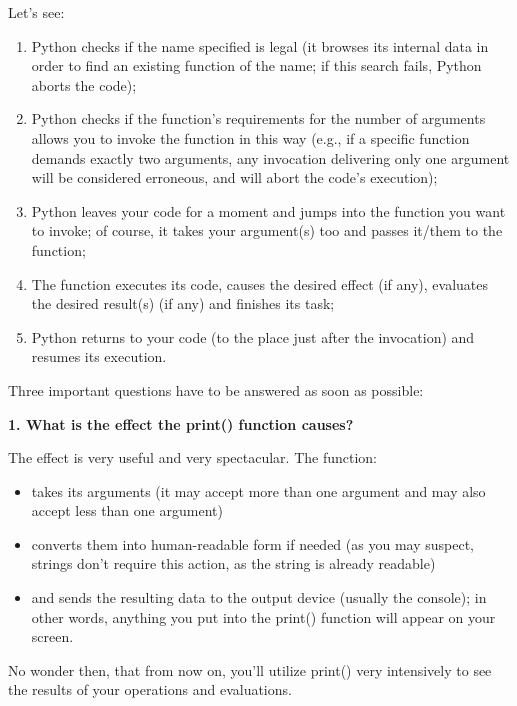 \documentclass[a4paper,10pt]{article}
\begin{document}
Let's see:
\begin{enumerate}
 \item Python checks if the name specified is legal (it browses its internal data in order to find an existing function of the name; if this search fails, Python aborts the code);
 \item Python checks if the function's requirements for the number of arguments allows you to invoke the function in this way (e.g., if a specific function demands exactly two arguments, any invocation delivering only one argument will be considered erroneous, and will abort the code's execution);
 \item Python leaves your code for a moment and jumps into the function you want to invoke; of course, it takes your argument(s) too and passes it/them to the function;
 \item The function executes its code, causes the desired effect (if any), evaluates the desired result(s) (if any) and finishes its task;
 \item Python returns to your code (to the place just after the invocation) and resumes its execution.
\end{enumerate}

Three important questions have to be answered as soon as possible:
\newline

\textbf{1. What is the effect the {\selectfont print()} function causes?}
\newline

The effect is very useful and very spectacular. The function:
\begin{itemize}
 \item takes its arguments (it may accept more than one argument and may also accept less than one argument)
 \item converts them into human-readable form if needed (as you may suspect, strings don't require this action, as the string is already readable)
 \item and sends the resulting data to the output device (usually the console); in other words, anything you put into the print() function will appear on your screen.
\end{itemize}

No wonder then, that from now on, you'll utilize {\selectfont print()} very intensively to see the results of your operations and evaluations.
\newline
\end{document}
